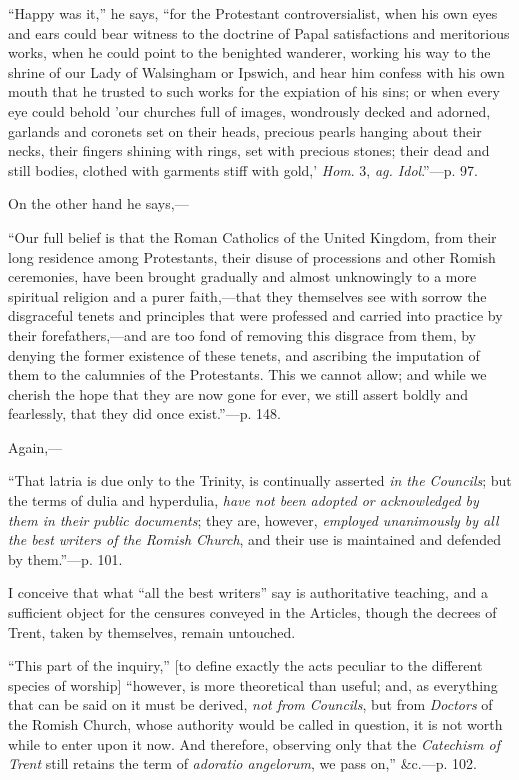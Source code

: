 ``Happy
was it,'' he says, ``for the Protestant controversialist, when his own
eyes and ears could bear witness to the doctrine of Papal
satisfactions and meritorious works, when he could point to the
benighted wanderer, working his way to the shrine of our Lady of
Walsingham or Ipswich, and hear him confess with his own mouth
that he trusted to such works for the expiation of his sins; or when
every eye could behold 'our churches full of images, wondrously decked
and adorned, garlands and coronets set on their heads, precious pearls
hanging about their necks, their fingers shining with rings, set with
precious stones; their dead and still bodies, clothed with garments
stiff with gold,' \emph{Hom}. 3, \emph{ag. Idol}.''—p. 97.

On the other hand he says,—

``Our
full belief is that the Roman Catholics of the United Kingdom, from
their long residence among Protestants, their disuse of processions
and other Romish ceremonies, have been brought gradually and almost
unknowingly to a more spiritual religion and a purer faith,—that
they themselves see with sorrow the disgraceful tenets and principles
that were professed and carried into practice by their
forefathers,—and are too fond of removing this disgrace from them,
by denying the former existence of these tenets, and ascribing the
imputation of them to the calumnies of the Protestants. This we cannot
allow; and while we cherish the hope that they are now gone for ever,
we still assert boldly and fearlessly, that they did once exist.''—p.
148.

Again,—

``That
latria is due only to the Trinity, is continually asserted \emph{in the
Councils}; but the terms of dulia and hyperdulia, \emph{have not been
adopted or acknowledged by them in their public documents}; they
are, however, \emph{employed unanimously by all the best writers of the
Romish Church}, and their use is maintained and defended by them.''—p.
101.

I conceive that what ``all the best writers'' say
is authoritative teaching, and a sufficient object for the censures
conveyed in the Articles, though the decrees of Trent, taken by
themselves, remain untouched.

``This
part of the inquiry,'' [to define exactly the acts peculiar to the
different species of worship] ``however, is more theoretical than
useful; and, as everything that can be said on it must be derived, \emph{not
from Councils}, but from \emph{Doctors} of the Romish Church, whose
authority would be called in question, it is not worth while to enter
upon it now. And therefore, observing only that the \emph{Catechism of
Trent} still retains the term of \emph{adoratio angelorum}, we pass
on,'' \&c.—p. 102.

